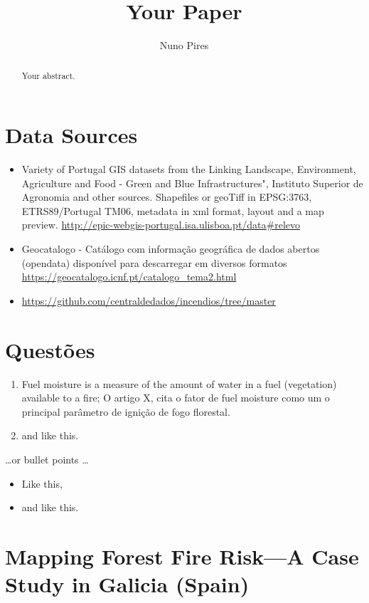 \documentclass{article}
\title{Your Paper}
\author{Nuno Pires}
\begin{document}
\maketitle

\begin{abstract}
Your abstract.
\end{abstract}

\section{Data Sources}
\begin{itemize}
    \item Variety of Portugal GIS datasets from the Linking Landscape, Environment, Agriculture and Food - Green and Blue Infrastructures", Instituto Superior de Agronomia and other sources. Shapefiles or geoTiff in EPSG:3763, ETRS89/Portugal TM06, metadata in xml format, layout and a map preview. \url{http://epic-webgis-portugal.isa.ulisboa.pt/data#relevo}
    \item Geocatalogo - Catálogo com informação geográfica de dados abertos (opendata) disponível para descarregar em diversos formatos \url{https://geocatalogo.icnf.pt/catalogo_tema2.html}
    \item \url{https://github.com/centraldedados/incendios/tree/master}
\end{itemize}

\section{Questões}
\begin{enumerate}
\item Fuel moisture is a measure of the amount of water in a fuel (vegetation) available to a fire; O artigo X, cita o fator de fuel moisture como um o principal parâmetro de ignição de fogo florestal. 
\item and like this.
\end{enumerate}
\dots or bullet points \dots
\begin{itemize}
\item Like this,
\item and like this.
\end{itemize}

\section{Mapping Forest Fire Risk—A Case Study in
Galicia (Spain) \cite{Novo2020MappingFF}}
\end{document}

